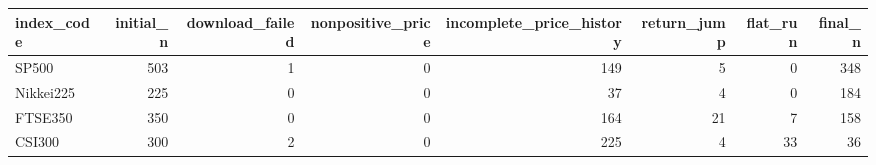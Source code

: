 \begin{tabular}{lrrrrrrr}
\toprule
index\_code & initial\_n & download\_failed & nonpositive\_price & incomplete\_price\_history & return\_jump & flat\_run & final\_n \\
\midrule
SP500 & 503 & 1 & 0 & 149 & 5 & 0 & 348 \\
Nikkei225 & 225 & 0 & 0 & 37 & 4 & 0 & 184 \\
FTSE350 & 350 & 0 & 0 & 164 & 21 & 7 & 158 \\
CSI300 & 300 & 2 & 0 & 225 & 4 & 33 & 36 \\
\bottomrule
\end{tabular}
